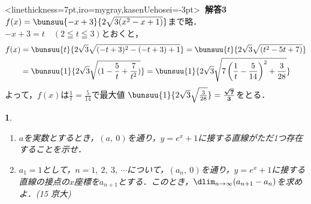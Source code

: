 \documentclass[10pt,
b5paper,
fleqn,
dvipdfmx,
uplatex
]{jsarticle}
\newtheorem{question}[Question]{}
\newcommand{\bqu}{\begin{mybox}\begin{question}}
\newcommand{\equ}{\end{question}\end{mybox}}
\newcommand{\benu}{\begin{enumerate}}
\newcommand{\eenu}{\end{enumerate}}
\newcommand{\bb}{\bf\boldmath}%
\newenvironment{leftbbar}{%
\def\FrameCommand{\color{mygray} \vrule width 5pt \hspace{1zw}
\color{black}}%
\MakeFramed {\advance\hsize-\width \FrameRestore}}%
{\endMakeFramed}
\newenvironment{解答3}{
\hspace{-2zw}\phkasen<linethickness=7pt,iro=mygray,kasenUehosei=-3pt>{\bf \large \ 解答3\ }\vspace{-1zw}\begin{leftbbar}}{\end{leftbbar}}
\begin{document}
{\begin{解答3}
$f(x)=\bunsuu{-x+3}{2\sqrt{3(x^2-x+1)}}$まで略．\\
$-x+3=t$\ \ $(2\leqq t \leqq 3)$とおくと，
\begin{align*}
f(x)&=\bunsuu{t}{2\sqrt{3}\sqrt{(-t+3)^2-(-t+3)+1}}
=\bunsuu{t}{2\sqrt{3}\sqrt{(t^2-5t+7)}}\\
&=\bunsuu{1}{2\sqrt{3}\sqrt{(1-\frac{5}{t}+\frac{7}{t^2})}}
=\bunsuu{1}{2\sqrt{3}\sqrt{7\left(\frac 1t-\frac{5}{14}\right)^2+\frac{3}{28}}}
\end{align*}
よって，$f(x)$は$\frac 1t=\frac{5}{14}$で最大値
$\bunsuu{1}{2\sqrt{3}\sqrt{\frac{3}{28}}}=\text{\bb $\frac{\sqrt 7}{3}$}$をとる．
\end{解答3}
\newpage
\fi




\bqu 
\benu
\item $a$を実数とするとき，$(a,\ 0)$を通り，$y=e^x+1$に接する直線がただ1つ存在することを示せ．
\item $a_1=1$として，$n=1,\ 2,\ 3,\ \cdots$について，$(a_n,\ 0)$を通り，$y=e^x+1$に接する直線の接点の$x$座標を$a_{n+1}$とする．このとき，$\dlim_{n\to \infty}(a_{n+1}-a_n)$を求めよ．\hfill(15 京大)
\eenu
\equ

}
\end{document}
